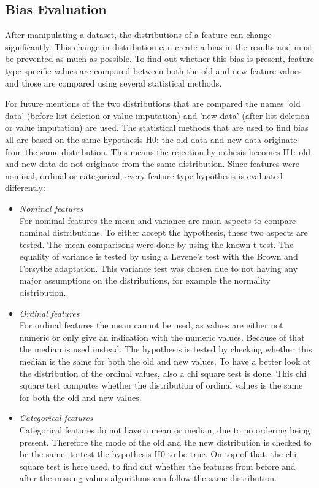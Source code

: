 \documentclass[10pt,a4paper]{report}
\begin{document}
	
	\subsection{Bias Evaluation}
	\label{MVsubsec:BiasEvaluation}
	
	After manipulating a dataset, the distributions of a feature can change significantly. This change in distribution can create a bias in the results and must be prevented as much as possible. To find out whether this bias is present, feature type specific values are compared between both the old and new feature values and those are compared using several statistical methods.
	
	For future mentions of the two distributions that are compared the names 'old data' (before list deletion or value imputation) and 'new data' (after list deletion or value imputation) are used. The statistical methods that are used to find bias all are based on the same hypothesis H0: the old data and new data originate from the same distribution. This means the rejection hypothesis becomes H1: old and new data do not originate from the same distribution. Since features were nominal, ordinal or categorical, every feature type hypothesis is evaluated differently:
	
	\begin{itemize}
		\item \textit{Nominal features} \\
		For nominal features the mean and variance are main aspects to compare nominal distributions. To either accept the hypothesis, these two aspects are tested. The mean comparisons were done by using the known t-test\cite{heiberger2004statistical}. The equality of variance is tested by using a Levene's test with the Brown and Forsythe adaptation. This variance test was chosen due to not having any major assumptions on the distributions, for example the normality distribution\cite{brown1974robust}.
		\item \textit{Ordinal features} \\
		For ordinal features the mean cannot be used, as values are either not numeric or only give an indication with the numeric values. Because of that the median is used instead. The hypothesis is tested by checking whether this median is the same for both the old and new values. To have a better look at the distribution of the ordinal values, also a chi square test is done. This chi square test computes whether the distribution of ordinal values is the same for both the old and new values\cite{satorra2001scaled}.
		\item \textit{Categorical features} \\
		Categorical features do not have a mean or median, due to no ordering being present. Therefore the mode of the old and the new distribution is checked to be the same, to test the hypothesis H0 to be true. On top of that, the chi square test is here used, to find out whether the features from before and after the missing values algorithms can follow the same distribution\cite{satorra2001scaled}.
	\end{itemize}
	
\end{document}

